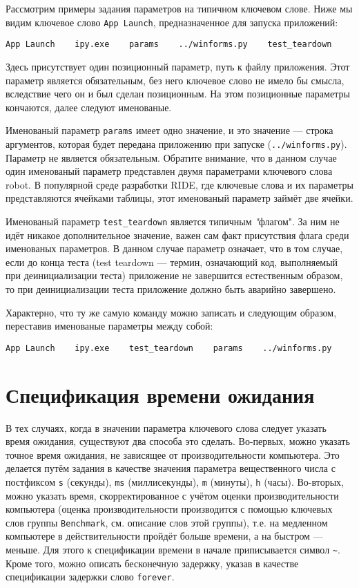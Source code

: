 \documentclass[11pt]{book} %
\begin{document}
Рассмотрим примеры задания параметров на типичном ключевом слове. Ниже мы видим ключевое слово \verb"App Launch", предназначенное для запуска приложений:

\begin{verbatim}
App Launch    ipy.exe    params    ../winforms.py    test_teardown
\end{verbatim}

Здесь присутствует один позиционный параметр, путь к файлу приложения. Этот параметр является обязательным, без него ключевое слово не имело бы смысла, вследствие чего он и был сделан позиционным. На этом позиционные параметры кончаются, далее следуют именованые.

Именованый параметр \verb"params" имеет одно значение, и это значение --- строка аргументов, которая будет передана приложению при запуске (\verb"../winforms.py"). Параметр не является обязательным. Обратите внимание, что в данном случае один именованый параметр представлен двумя параметрами ключевого слова robot. В популярной среде разработки RIDE, где ключевые слова и их параметры представляются ячейками таблицы, этот именованый параметр займёт две ячейки.

Именованый параметр \verb"test_teardown" является типичным \emph"флагом". За ним не идёт никакое дополнительное значение, важен сам факт присутствия флага среди именованых параметров. В данном случае параметр означает, что в том случае, если до конца теста (test teardown --- термин, означающий код, выполняемый при деинициализации теста) приложение не завершится естественным образом, то при деинициализации теста приложение должно быть аварийно завершено.

Характерно, что ту же самую команду можно записать и следующим образом, переставив именованые параметры между собой:

\begin{verbatim}
App Launch    ipy.exe    test_teardown    params    ../winforms.py
\end{verbatim}


\section{Спецификация времени ожидания}

В тех случаях, когда в значении параметра ключевого слова следует указать время ожидания, существуют два способа это сделать. Во-первых, можно указать точное время ожидания, не зависящее от производительности компьютера. Это делается путём задания в качестве значения параметра вещественного числа с постфиксом \verb"s" (секунды), \verb"ms" (миллисекунды), \verb"m" (минуты), \verb"h" (часы). Во-вторых, можно указать время, скорректированное с учётом оценки производительности компьютера (оценка производительности производится с помощью ключевых слов группы \verb"Benchmark", см. описание слов этой группы), т.е. на медленном компьютере в действительности пройдёт больше времени, а на быстром --- меньше. Для этого к спецификации времени в начале приписывается символ \verb"~". Кроме того, можно описать бесконечную задержку, указав в качестве спецификации задержки слово \verb"forever".
\end{document}
